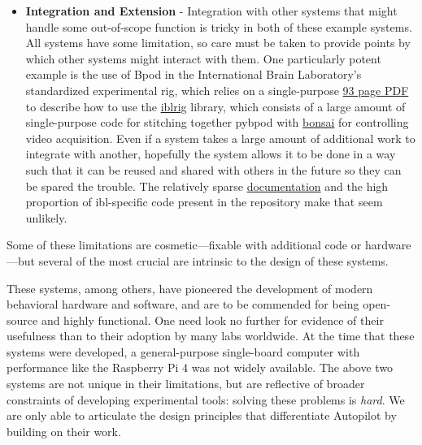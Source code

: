 \begin{itemize}[resume*, before=\vspace{0pt}, after=\vspace{\baselineskip}]
    \item \textbf{Integration and Extension} - Integration with other systems that might handle some out-of-scope function is tricky in both of these example systems. All systems have some limitation, so care must be taken to provide points by which other systems might interact with them. One particularly potent example is the use of Bpod in the International Brain Laboratory's standardized experimental rig\citep{laboratoryStandardizedReproducibleMeasurement2020b}, which relies on a single-purpose \href{https://figshare.com/articles/preprint/A_standardized_and_reproducible_method_to_measure_decision-making_in_mice_Appendix_3_IBL_protocol_for_setting_up_the_behavioral_training_rig/11634732}{93 page PDF} to describe how to use the \href{https://github.com/int-brain-lab/iblrig}{iblrig} library, which consists of a large amount of single-purpose code for stitching together pybpod with \href{https://github.com/int-brain-lab/iblrig/blob/18569278fc2d8cd3266adb2a5f660a43f8f2582e/iblrig/bonsai.py}{bonsai} for controlling video acquisition. Even if a system takes a large amount of additional work to integrate with another, hopefully the system allows it to be done in a way such that it can be reused and shared with others in the future so they can be spared the trouble. The relatively sparse \href{https://iblrig.readthedocs.io/en/latest/index.html}{documentation} and the high proportion of ibl-specific code present in the repository make that seem unlikely.
\end{itemize}

Some of these limitations are cosmetic---fixable with additional code or hardware---but several of the most crucial are intrinsic to the design of these systems.

These systems, among others, have pioneered the development of modern behavioral hardware and software, and are to be commended for being open-source and highly functional. One need look no further for evidence of their usefulness than to their adoption by many labs worldwide. At the time that these systems were developed, a general-purpose single-board computer with performance like the Raspberry Pi 4 was not widely available. The above two systems are not unique in their limitations, but are reflective of broader constraints of developing experimental tools: solving these problems is \textit{hard}. We are only able to articulate the design principles that differentiate Autopilot by building on their work. 
